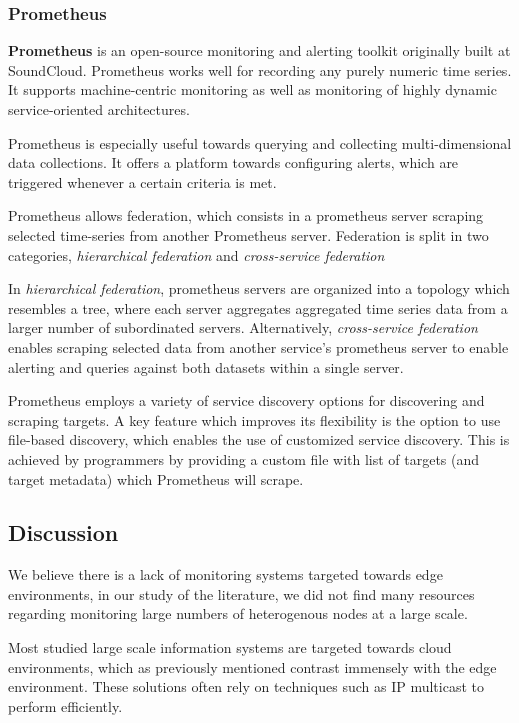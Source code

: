\subsubsection{Prometheus}

\textbf{Prometheus} \cite{prometheus} is an open-source monitoring and alerting toolkit originally built at SoundCloud. Prometheus works well for recording any purely numeric time series. It supports machine-centric monitoring as well as monitoring of highly dynamic service-oriented architectures. 

Prometheus is especially useful towards querying and collecting multi-dimensional data collections. It offers a platform towards configuring alerts, which are triggered whenever a certain criteria is met.

Prometheus allows federation, which consists in a prometheus server scraping selected time-series from another Prometheus server. Federation is split in two categories, \textit{hierarchical federation} and \textit{cross-service federation} 

In \textit{hierarchical federation}, prometheus servers are organized into a topology which resembles a tree, where each server aggregates aggregated time series data from a larger number of subordinated servers. Alternatively,  \textit{cross-service federation} enables scraping selected data from another service's prometheus server to enable alerting and queries against both datasets within a single server. 

Prometheus employs a variety of service discovery options for discovering and scraping targets. A key feature which improves its flexibility is the option to use file-based discovery, which enables the use of customized service discovery. This is achieved by programmers by providing a custom file with list of targets (and target metadata) which Prometheus will scrape.

\subsection{Discussion}

We believe there is a lack of monitoring systems targeted towards edge environments, in our study of the literature, we did not find many resources regarding monitoring large numbers of heterogenous nodes at a large scale.

Most studied large scale information systems are targeted towards cloud environments, which as previously mentioned contrast immensely with the edge environment. These solutions often rely on techniques such as IP multicast \cite{massie2004ganglia} to perform efficiently.

